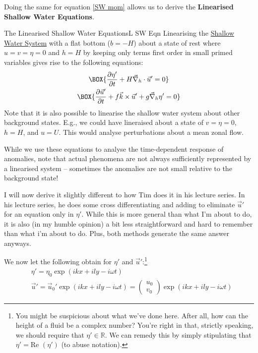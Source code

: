 Doing the same for equation \ref{SW mom} allows us to derive the \textbf{Linearised Shallow Water Equations}.

\begin{fact}{The Linearised Shallow Water Equations}{L SW Eqn}\label{L SW Eqn}
    Linearising the \hyperref[Shallow Water System]{Shallow Water System} with a flat bottom (\(b=-H\)) about a state of rest where \(u=v=\eta=0\) and \(h=H\) by keeping only terms first order in small primed variables gives rise to the following equations: 
    \begin{gather}
        \label{SW Lin mass}
        \BOX{\frac{\partial \eta'}{\partial t}+H\vec{\nabla}_h\cdot \vec{u}'=0}\\
        \label{SW Lin mom}
        \BOX{
            \frac{\partial \vec{u}'}{\partial t}+f\vec{k}\times\vec{u}'
            +
            g\vec{\nabla}_h \eta'=0
        }
    \end{gather}
    Note that it is also possible to linearise the shallow water system about other background states. E.g., we could have lineraised about a state of \(v=\eta=0\), \(h=H\), and \(u=U\). This would analyse perturbations about a mean zonal flow.

    While we use these equations to analyse the time-dependent response of anomalies, note that actual phenomena are not always sufficiently represented by a linearised system – sometimes the anomalies are not small relative to the background state!
\end{fact}

I will now derive it slightly different to how Tim does it in his lecture series. In his lecture series, he does some cross differentiating and adding to eliminate \(\vec{u}'\) for an equation only in \(\eta'\). While this is more general than what I'm about to do, it is also (in my humble opinion) a bit less straightforward and hard to remember than what i'm about to do. Plus, both methods generate the same answer anyways.

We now let the following obtain for \(\eta'\) and \(\vec{u}'\):\footnote{
    You might be suspicious about what we've done here. After all, how can the height of a fluid be a complex number? You're right in that, strictly speaking, we should require that \(\eta'\in\mathbb{R}\). We can remedy this by simply stipulating that \(\eta'=\text{Re }\left( \eta' \right)\) (to abuse notation).
}
\begin{align*}
    &\eta' = \eta_0 \exp\left( ikx+ily-i\omega t \right)\\
    &\vec{u}' = \vec{u}_0' \exp\left( ikx+ily-i\omega t \right)=\left( \begin{array}{c}
        u_0\\v_0
    \end{array} \right)\exp\left( ikx+ily-i\omega t \right)
\end{align*}

